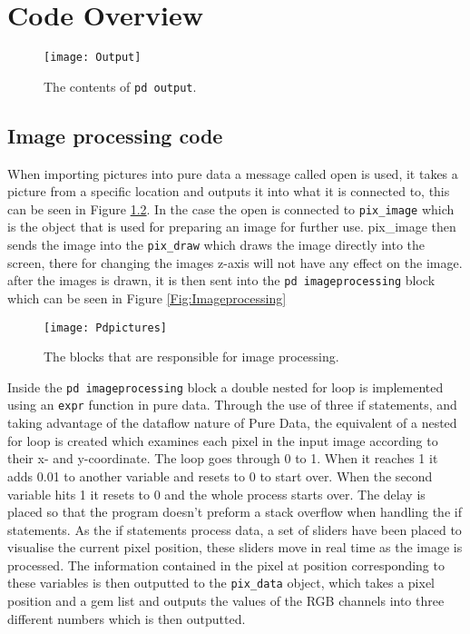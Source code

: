 \chapter{Code Overview}\label{ch:codeoverview}


\begin{figure}
\centering
\texttt{[image: Output]}
\caption{The contents of \texttt{pd output}.}
\label{Fig:Output}
\end{figure}

\section{Image processing code}
When importing pictures into pure data a message called open is used, it takes a picture from a specific location and outputs it into what it is connected to, this can be seen in Figure \ref{Fig:pdpicture}. In the case the open is connected to \texttt{pix\_image} which is the object that is used for preparing an image for further use. pix\_image then sends the image into the \texttt{pix\_draw} which draws the image directly into the screen, there for changing the images z-axis will not have any effect on the image. after the images is drawn, it is then sent into the \texttt{pd imageprocessing} block which can be seen in Figure \ref{Fig:Imageprocessing} 

\begin{figure}
\centering
\texttt{[image: Pdpictures]}
\caption{The blocks that are responsible for image processing.}
\label{Fig:pdpicture}
\end{figure}

Inside the \texttt{pd imageprocessing} block a double nested for loop is implemented using an \texttt{expr} function in pure data. Through the use of three if statements, and taking advantage of the dataflow nature of Pure Data, the equivalent of a nested for loop is created which examines each pixel in the input image according to their x- and y-coordinate. The loop goes through 0 to 1. When it reaches 1 it adds 0.01 to another variable and resets to 0 to start over. When the second variable hits 1 it resets to 0 and the whole process starts over. The delay is placed so that the program doesn't preform a stack overflow when handling the if statements. 
As the if statements process data, a set of sliders have been placed to visualise the current pixel position, these sliders move in real time as the image is processed. The information contained in the pixel at position corresponding to these variables is then outputted to the \texttt{pix\_data} object, which takes a pixel position and a gem list and outputs the values of the RGB channels into three different numbers which is then outputted. 

